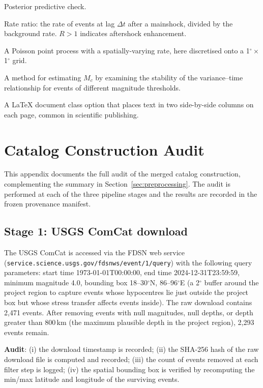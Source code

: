 \documentclass[10pt,a4paper,twocolumn]{article}
\begin{document}
\begin{description}[leftmargin=1.2em,itemsep=2pt,topsep=2pt]
\item[PPC] Posterior predictive check.
\item[R$(\Delta t)$] Rate ratio: the rate of events at lag $\Delta t$ after a mainshock, divided by the background rate. $R>1$ indicates aftershock enhancement.
\item[Spatial Poisson] A Poisson point process with a spatially-varying rate, here discretised onto a 1$^\circ\times$1$^\circ$ grid.
\item[Stepp analysis] A method for estimating $M_c$ by examining the stability of the variance--time relationship for events of different magnitude thresholds.
\item[Twocolumn] A LaTeX document class option that places text in two side-by-side columns on each page, common in scientific publishing.
\end{description}

\section{Catalog Construction Audit}\label{app:catalog-audit}

This appendix documents the full audit of the merged catalog construction, complementing the summary in Section~\ref{sec:preprocessing}. The audit is performed at each of the three pipeline stages and the results are recorded in the frozen provenance manifest.

\subsection{Stage 1: USGS ComCat download}

The USGS ComCat is accessed via the FDSN web service (\texttt{service.science.usgs.gov/fdsnws/event/1/query}) with the following query parameters: start time 1973-01-01T00:00:00, end time 2024-12-31T23:59:59, minimum magnitude 4.0, bounding box 18--30$^\circ$N, 86--96$^\circ$E (a 2$^\circ$ buffer around the project region to capture events whose hypocentres lie just outside the project box but whose stress transfer affects events inside). The raw download contains 2{,}471 events. After removing events with null magnitudes, null depths, or depth greater than 800\,km (the maximum plausible depth in the project region), 2{,}293 events remain.

\textbf{Audit}: (i) the download timestamp is recorded; (ii) the SHA-256 hash of the raw download file is computed and recorded; (iii) the count of events removed at each filter step is logged; (iv) the spatial bounding box is verified by recomputing the min/max latitude and longitude of the surviving events.
\end{document}
